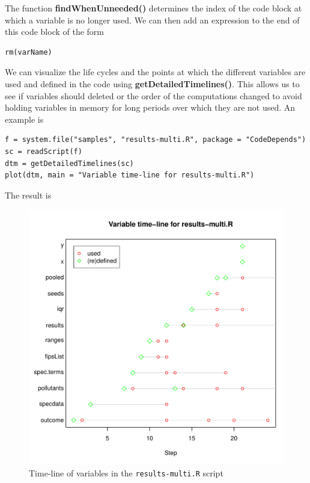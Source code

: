 \documentclass{article}
\def\Rfunc#1{\textbf{#1()}}
\begin{document}
The function \Rfunc{findWhenUnneeded} determines the
index of the code block at which a variable is no longer used.
We can then add an expression to the end of this code block 
of the form
\begin{verbatim}
rm(varName)
\end{verbatim}

We can visualize the life cycles and the points at which 
the different variables are used and defined in the code
using \Rfunc{getDetailedTimelines}. This allows us to see if
variables should deleted or the order of the computations
changed to avoid holding variables in memory for long periods
over which they are not used.
An example is 
\begin{verbatim}
f = system.file("samples", "results-multi.R", package = "CodeDepends")
sc = readScript(f)
dtm = getDetailedTimelines(sc)
plot(dtm, main = "Variable time-line for results-multi.R")
\end{verbatim}
The result is
\begin{figure}
  \centering
  \includegraphics{resultsMultiTimeline.pdf}
  \caption{Time-line of variables in the \texttt{results-multi.R} script}
\end{figure}
\end{document}
